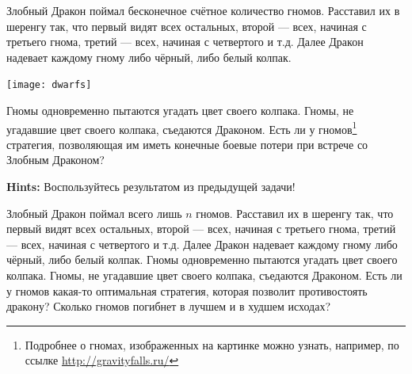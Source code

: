 \documentclass[12pt, a4paper, oneside]{article}
\begin{document}
\begin{problem}{}
Злобный Дракон поймал бесконечное счётное количество гномов. Расставил их в шеренгу так, что первый видят всех остальных, второй --- всех, начиная с третьего гнома, третий --- всех, начиная с четвертого и т.д. Далее Дракон надевает каждому гному либо чёрный, либо белый колпак.

\begin{center}
\texttt{[image: dwarfs]}
\end{center}

 Гномы одновременно пытаются угадать цвет своего колпака. Гномы, не угадавшие цвет своего колпака, съедаются Драконом. Есть ли у гномов\footnote{Подробнее о гномах, изображенных на картинке можно узнать, например, по ссылке \url{http://gravityfalls.ru/}} стратегия, позволяющая им иметь конечные боевые потери при встрече со Злобным Драконом?

\textbf{Hints:} Воспользуйтесь результатом из предыдущей задачи!
\end{problem}





\begin{problem}{}
Злобный Дракон поймал всего лишь $n$ гномов. Расставил их в шеренгу так, что первый видят всех остальных, второй --- всех, начиная с третьего гнома, третий --- всех, начиная с четвертого и т.д. Далее Дракон надевает каждому гному либо чёрный, либо белый колпак. Гномы одновременно пытаются угадать цвет своего колпака. Гномы, не угадавшие цвет своего колпака, съедаются Драконом. Есть ли у гномов какая-то оптимальная стратегия, которая позволит противостоять дракону? Сколько гномов погибнет в лучшем и в худшем исходах?
\end{problem}
\end{document}
